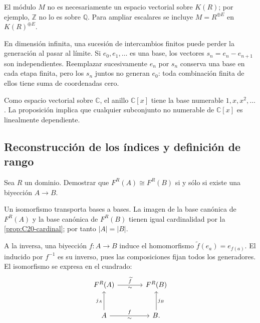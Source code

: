 \begin{obs}
El módulo $M$ no es necesariamente un espacio vectorial sobre $K(R)$; por ejemplo, $\mathbb Z$ no lo es sobre $\mathbb Q$. Para ampliar escalares se incluye $M=R^{\oplus E}$ en $K(R)^{\oplus E}$.

En dimensión infinita, una sucesión de intercambios finitos puede perder la generación al pasar al límite. Si $e_0,e_1,\ldots$ es una base, los vectores $s_n=e_n-e_{n+1}$ son independientes. Reemplazar sucesivamente $e_n$ por $s_n$ conserva una base en cada etapa finita, pero los $s_n$ juntos no generan $e_0$: toda combinación finita de ellos tiene suma de coordenadas cero.
\end{obs}

\begin{ejem}
Como espacio vectorial sobre $\mathbb C$, el anillo $\mathbb C[x]$ tiene la base numerable $1,x,x^2,\ldots$. La proposición implica que cualquier subconjunto no numerable de $\mathbb C[x]$ es linealmente dependiente.
\end{ejem}

\subsection{Reconstrucción de los índices y definición de rango}
\begin{ejer}[Remisión a VI.1.8]\label{ejer:C20-indices}
Sea $R$ un dominio. Demostrar que $F^R(A)\cong F^R(B)$ si y sólo si existe una biyección $A\to B$.
\end{ejer}
\begin{sol}
Un isomorfismo transporta bases a bases. La imagen de la base canónica de $F^R(A)$ y la base canónica de $F^R(B)$ tienen igual cardinalidad por la \cref{prop:C20-cardinal}; por tanto $|A|=|B|$.

A la inversa, una biyección $f:A\to B$ induce el homomorfismo $\widetilde f(e_a)=e_{f(a)}$. El inducido por $f^{-1}$ es su inverso, pues las composiciones fijan todos los generadores. El isomorfismo se expresa en el cuadrado:
\[
\begin{tikzcd}[row sep=large,column sep=large]
F^R(A)\arrow[r,"\widetilde f","\sim"']&F^R(B)\\
A\arrow[u,"j_A"]\arrow[r,"f","\sim"']&B\arrow[u,"j_B"'].
\end{tikzcd}
\]
\end{sol}

